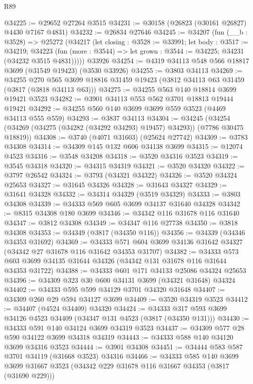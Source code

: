 \begin{lexlean}{R89}
\begin{coremodule}
@34225 := @29652 @27264 @3515
@34231 := @30158 (@26823 (@30161 @26827) @4430 @7167 @4831)
@34232 := @26834 @27646
@34245 := @34207
    (fun (__b : @3528) =>
    @25272
      (@34217
        (let closing : @3528 := @33991;
        let body : @3517 := @34219;
        @34223 (fun (more : @3544) => let grown : @3544 := @34225; @34231 (@34232 @3515 @4831)))))
    @33926
@34254 := @4319 @34113 @548 @566 @18817 @3699 (@31549 @19423) (@3530 @33926)
@34255 := @3803 @34113
@34269 := @34255
    @270
    @565
    @3699
    @18816
    @31459
    @19423
    (@3812 @34113 @63 @31459 (@3817 (@3818 @34113 @63)))
@34275 := @34255 @563 @140 @18814 @3699 @19421 @3523
@34282 := @3901 @34113 @553 @562 @3701 @18813 @19444 @19421
@34292 := @34255 @560 @140 @3699 @3699 @559 @3523 (@4469 @34113 @555 @559)
@34293 := @3837 @34113
@34304 := @34245
    (@34254 (@34269 (@34275 (@34282 (@34292 @34293) @19457) @34293)) (@7786 @30475 @18819))
@34308 := @3740 (@4071 @31603) (@25624 @27742)
@34309 := @3783 @34308
@34314 := @34309 @145 @132 @606 @34138 @3699
@34315 := @12074 @4523
@34316 := @3548 @34208
@34318 := @3520 @34316 @3523
@34319 := @3545 @34318
@34320 := @34315 @34319
@34321 := @3520 @34320
@34322 := @3797 @26542
@34324 := @3793 (@34321 @34322)
@34326 := @3520 @34324 @25653
@34327 := @31645 @34326
@34328 := @31643 @34327
@34329 := @31641 @34328
@34332 := @34314 @34329 (@3519 @34329)
@34333 := @3803 @34308
@34339 := @34333 @569 @605 @3699 @34137 @31640 @34328
@34342 := @8315 @34308 @180 @3699
@34346 := @34342 @116 @31678 @116 @31640
@34347 := @3812 @34308
@34349 := @34347 @116 @27738
@34350 := @3818 @34308
@34353 := @34349 (@3817 (@34350 @116))
@34356 := @34339 (@34346 @34353 @31692)
@34369 := @34333 @571 @604 @3699 @34136 @31642 @34327 (@34342 @27 @31678 @116 @31642 @34353 @31707)
@34382 := @34333 @573 @603 @3699 @34135 @31644 @34326 (@34342 @131 @31678 @116 @31644 @34353 @31722)
@34388 := @34333 @601 @171 @34133 @25086 @34324 @25653
@34396 := @34309 @323 @30 @600 @34131 @3699 (@34321 @31648) @34324
@34402 := @34333 @595 @599 @34129 @3701 @34320 @31648
@34407 := @34309 @260 @29 @594 @34127 @3699
@34409 := @3520 @34319 @3523
@34412 := @34407 (@4524 @34409) @34320
@34424 := @34333 @317 @593 @3699 @34126 @4523 @34409 (@34347 @131 @4523 (@3817 (@34350 @131)))
@34430 := @34333 @591 @140 @34124 @3699 @34319 @3523
@34437 := @34309 @577 @28 @590 @34122 @3699 @34318 @34319
@34443 := @34333 @588 @140 @34120 @3699 @34316 @3523
@34444 := @3901 @34308
@34451 := @34444 @583 @587 @3701 @34119 (@31668 @3523) @34316
@34466 := @34333
    @585
    @140
    @3699
    @3699
    @31667
    @3523
    (@34342 @229 @31678 @116 @31667 @34353 (@3817 (@31690 @229)))

\end{coremodule}
\end{lexlean}
